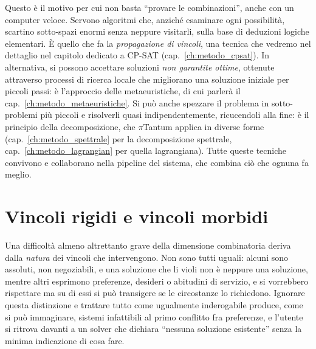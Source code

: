 Questo \`e il motivo per cui non basta ``provare le
combinazioni'', anche con un computer veloce. Servono
algoritmi che, anzich\'e esaminare ogni possibilit\`a, scartino
sotto-spazi enormi senza neppure visitarli, sulla base di
deduzioni logiche elementari. \`E quello che fa la
\emph{propagazione di vincoli}, una tecnica che vedremo nel
dettaglio nel capitolo dedicato a CP-SAT
(cap.~\ref{ch:metodo_cpsat}). In alternativa, si possono
accettare soluzioni \emph{non garantite ottime}, ottenute
attraverso processi di ricerca locale che migliorano una
soluzione iniziale per piccoli passi: \`e l'approccio delle
metaeuristiche, di cui parler\`a il
cap.~\ref{ch:metodo_metaeuristiche}. Si pu\`o anche
spezzare il problema in sotto-problemi pi\`u piccoli e
risolverli quasi indipendentemente, ricucendoli alla fine: \`e
il principio della decomposizione, che $\pi$Tantum applica in
diverse forme (cap.~\ref{ch:metodo_spettrale} per la
decomposizione spettrale, cap.~\ref{ch:metodo_lagrangian} per
quella lagrangiana). Tutte queste tecniche convivono e
collaborano nella pipeline del sistema, che combina ci\`o che
ognuna fa meglio.

\section{Vincoli rigidi e vincoli morbidi}

Una difficolt\`a almeno altrettanto grave della dimensione
combinatoria deriva dalla \emph{natura} dei vincoli che
intervengono. Non sono tutti uguali: alcuni sono assoluti,
non negoziabili, e una soluzione che li violi non \`e neppure
una soluzione, mentre altri esprimono preferenze, desideri o
abitudini di servizio, e si vorrebbero rispettare ma su di
essi si pu\`o transigere se le circostanze lo richiedono.
Ignorare questa distinzione e trattare tutto come ugualmente
inderogabile produce, come si pu\`o immaginare, sistemi
infattibili al primo conflitto fra preferenze, e l'utente si
ritrova davanti a un solver che dichiara ``nessuna soluzione
esistente'' senza la minima indicazione di cosa fare.

